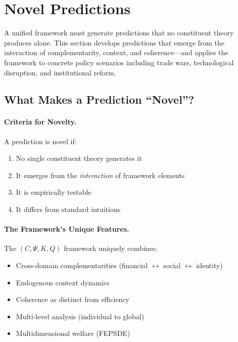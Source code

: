 \section{Novel Predictions}
\label{sec:predictions}
\label{sec:predictions}
\label{sec:novelpredictions}

A unified framework must generate predictions that no constituent theory 
produces alone. This section develops predictions that emerge from the
interaction of complementarity, context, and coherence---and applies
the framework to concrete policy scenarios including trade wars,
technological disruption, and institutional reform.

\subsection{What Makes a Prediction ``Novel''?}

\paragraph{Criteria for Novelty.}
A prediction is novel if:
\begin{enumerate}
  \item No single constituent theory generates it
  \item It emerges from the \emph{interaction} of framework elements
  \item It is empirically testable
  \item It differs from standard intuitions
\end{enumerate}

\paragraph{The Framework's Unique Features.}
The $(C, \Psi, K, Q)$ framework uniquely combines:
\begin{itemize}
  \item Cross-domain complementarities (financial $\leftrightarrow$ social $\leftrightarrow$ identity)
  \item Endogenous context dynamics
  \item Coherence as distinct from efficiency
  \item Multi-level analysis (individual to global)
  \item Multidimensional welfare (FEPSDE)
\end{itemize}

